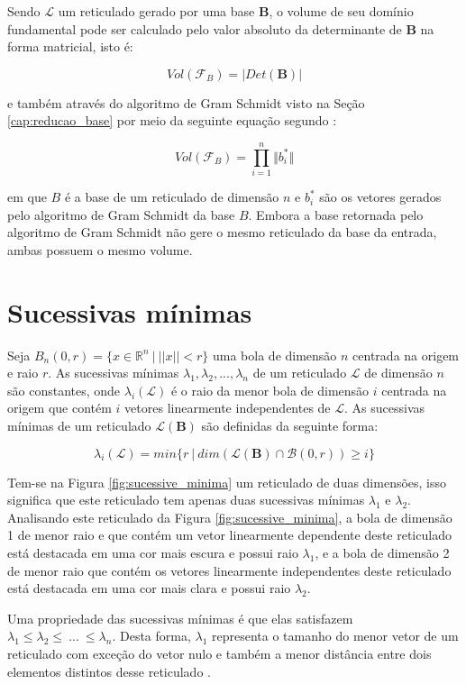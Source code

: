     Sendo $\mathcal{L}$ um reticulado gerado por uma base $\textbf{B}$, o volume de seu domínio fundamental pode ser calculado pelo valor absoluto da determinante de $\textbf{B}$ na forma matricial, isto é:

    $$Vol(\mathcal{F}_B) = |Det(\textbf{B})|$$

    \noindent
    e também através do algoritmo de Gram Schmidt visto na Seção \ref{cap:reducao_base} por meio da seguinte equação segundo \cite{barros}:

    $$Vol(\mathcal{F}_B) = \prod_{i=1}^{n} \Vert b_{i}^{*} \Vert$$

    \noindent
    em que $B$ é a base de um reticulado de dimensão $n$ e $b_{i}^{*}$ são os vetores gerados pelo algoritmo de Gram Schmidt da base $B$. Embora a base retornada pelo algoritmo de Gram Schmidt não gere o mesmo reticulado da base da entrada, ambas possuem o mesmo volume.

\section{Sucessivas mínimas}
    Seja $B_{n}(0, r) = \{x \in \mathbb{R}^{n}\ |\ ||x|| < r\}$ uma bola de dimensão $n$ centrada na origem e raio $r$. As sucessivas mínimas $\lambda_1, \lambda_2,...,\lambda_n$ de um reticulado $\mathcal{L}$ de dimensão $n$ são constantes, onde $\lambda_i(\mathcal{L})$ é o raio da menor bola de dimensão $i$ centrada na origem que contém $i$ vetores linearmente independentes de $\mathcal{L}$. As sucessivas mínimas de um reticulado $\mathcal{L}(\textbf{B})$  são definidas da seguinte forma:

    $$\lambda_i(\mathcal{L}) = min\{r\ |\ dim(\mathcal{L}(\textbf{B}) \cap \mathcal{B}(0, r)) \geq i  \}$$
    
    Tem-se na Figura \ref{fig:sucessive_minima} um reticulado de duas dimensões, isso significa que este reticulado tem apenas duas sucessivas mínimas $\lambda_1$ e $\lambda_2$. Analisando este reticulado da Figura \ref{fig:sucessive_minima}, a bola de dimensão 1 de menor raio e que contém um vetor linearmente dependente deste reticulado está destacada em uma cor mais escura e possui raio $\lambda_1$, e a bola de dimensão 2 de menor raio que contém os vetores linearmente independentes deste reticulado está destacada em uma cor mais clara e possui raio $\lambda_2$.

    Uma propriedade das sucessivas mínimas é que elas satisfazem $\lambda_1 \leq \lambda_2 \leq\ ...\  \leq \lambda_n$. Desta forma, $\lambda_1$ representa o tamanho do menor vetor de um reticulado com exceção do vetor nulo e também a menor distância entre dois elementos distintos desse reticulado \cite{daniele-lattices}.


